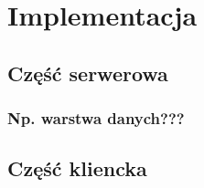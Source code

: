 \clearpage %

\section{Implementacja}

\subsection{Część serwerowa}

\subsubsection{Np. warstwa danych???}

\subsection{Część kliencka}